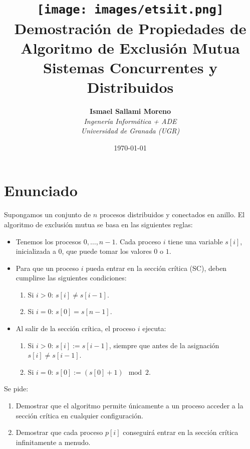 \documentclass[a4paper,12pt]{article}
\title{
    \vspace{-2cm}
    \texttt{[image: images/etsiit.png]} \\ %
    \LARGE \textbf{Demostración de Propiedades de Algoritmo de Exclusión Mutua} \\[0.5cm]
    \large \textbf{Sistemas Concurrentes y Distribuidos} \\[0.5cm]}
\author{
    \textbf{Ismael Sallami Moreno} \\
    \textit{Ingenería Informática + ADE} \\
    \textit{Universidad de Granada (UGR)} \\
}
\date{\today}
\begin{document}
\maketitle
\thispagestyle{empty}


\newpage

\tableofcontents
\newpage

\section{Enunciado}

Supongamos un conjunto de $n$ procesos distribuidos y conectados en anillo. El algoritmo de exclusión mutua se basa en las siguientes reglas:

\begin{itemize}
    \item Tenemos los procesos $0, \ldots, n-1$. Cada proceso $i$ tiene una variable $s[i]$, inicializada a 0, que puede tomar los valores $0$ o $1$.
    \item Para que un proceso $i$ pueda entrar en la sección crítica (SC), deben cumplirse las siguientes condiciones:
    \begin{enumerate}
        \item Si $i > 0$: $s[i] \neq s[i-1]$.
        \item Si $i = 0$: $s[0] = s[n-1]$.
    \end{enumerate}
    \item Al salir de la sección crítica, el proceso $i$ ejecuta:
    \begin{enumerate}
        \item Si $i > 0$: $s[i] := s[i-1]$, siempre que antes de la asignación $s[i] \neq s[i-1]$.
        \item Si $i = 0$: $s[0] := (s[0] + 1) \mod 2$.
    \end{enumerate}
\end{itemize}

Se pide:

\begin{enumerate}
    \item Demostrar que el algoritmo permite únicamente a un proceso acceder a la sección crítica en cualquier configuración.
    \item Demostrar que cada proceso $p[i]$ conseguirá entrar en la sección crítica infinitamente a menudo.
\end{enumerate}
\end{document}
